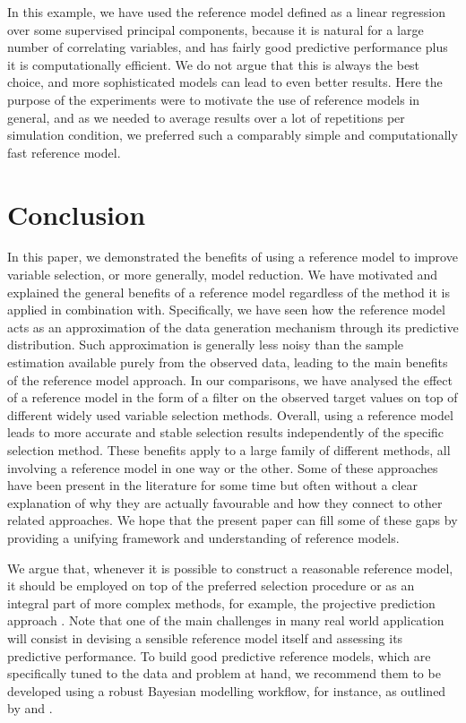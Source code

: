 \documentclass[a4]{article}
\theoremstyle{definition}
\begin{document}
In this example, we have used the reference model defined as a linear
regression over some supervised principal components, because it is
natural for a large number of correlating variables, and has fairly good
predictive performance plus it is computationally efficient. We do not
argue that this is always the best choice, and more sophisticated
models can lead to even better results. Here the purpose of the
experiments were to motivate the use of reference models in general,
and as we needed to average results over a lot of repetitions per
simulation condition, we preferred such a comparably simple and
computationally fast reference model.

\hypertarget{conclusion}{
\section{Conclusion}\label{conclusion}}

In this paper, we demonstrated the benefits of using a reference model
to improve variable selection, or more generally, model reduction. 
We have motivated and explained the general benefits
of a reference model regardless of the method it is applied in combination
with. Specifically, we have seen how the reference model acts as an
approximation of the data generation mechanism through its predictive
distribution. Such approximation is generally less noisy than the
sample estimation available purely from the observed data, leading to
the main benefits of the reference model approach. In our comparisons,
we have analysed the effect of a reference model in the form of a
filter on the observed target values on top of different widely used
variable selection methods. Overall, using a reference model leads to
more accurate and stable selection results independently of the
specific selection method. These benefits apply to a large family of
different methods, all involving a reference model in one way or the
other. Some of these approaches have been present in the literature for some time
\cite[e.g., see references in][]{vehtari2012survey,paper:projpred}
but often without a clear explanation of {why} they are actually
favourable and how they connect to other related approaches. We hope
that the present paper can fill some of these gaps by providing a
unifying framework and understanding of reference models.

We argue that, whenever it is possible to construct a reasonable
reference model, it should be employed on top of the preferred
selection procedure or as an integral part of more complex methods,
for example, the projective prediction approach
\citep{paper:projpred}. Note that one of the main challenges in many
real world application will consist in devising a sensible reference
model itself and assessing its predictive performance.
To build good predictive reference models, which are specifically
tuned to the data and problem at hand, we recommend them to be
developed using a robust Bayesian modelling workflow, for instance, as
outlined by \citet{gelman2020bayesian} and \citet{gabry2019visualization}.
\end{document}
